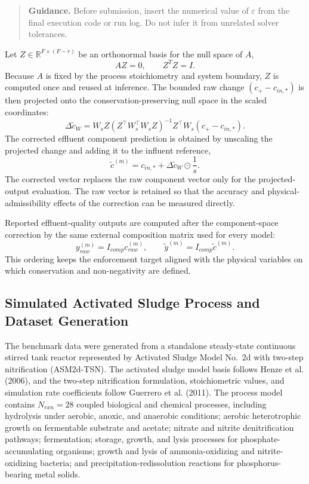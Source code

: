 \documentclass[a4paper,fleqn]{cas-sc}
\newcommand{\draftguidance}[1]{%
\begin{quote}
\small
\textbf{Guidance.} #1
\end{quote}
}
\begin{document}
\draftguidance{Before submission, insert the numerical value of $\varepsilon$ from the final execution code or run log. Do not infer it from unrelated solver tolerances.}

Let $Z \in \mathbb{R}^{F \times (F-r)}$ be an orthonormal basis for the null space of $A$,
\begin{equation}
\label{eq:null_space_basis}
AZ=0, \qquad Z^TZ=I.
\end{equation}
Because $A$ is fixed by the process stoichiometry and system boundary, $Z$ is computed once and reused at inference. The bounded raw change $(c_+ - c_{in,*})$ is then projected onto the conservation-preserving null space in the scaled coordinates:
\begin{equation}
\label{eq:kv_scaled_projection}
\Delta\tilde{c}_W =
W_s Z \left(Z^\top W_s^\top W_s Z\right)^{-1}
Z^\top W_s \left(c_+ - c_{in,*}\right).
\end{equation}
The corrected effluent component prediction is obtained by unscaling the projected change and adding it to the influent reference,
\begin{equation}
\label{eq:corrected_component_prediction}
\tilde{c}^{(m)} =
c_{in,*} + \Delta\tilde{c}_W \odot \frac{1}{s}.
\end{equation}
The corrected vector replaces the raw component vector only for the projected-output evaluation. The raw vector is retained so that the accuracy and physical-admissibility effects of the correction can be measured directly.

Reported effluent-quality outputs are computed after the component-space correction by the same external composition matrix used for every model:
\begin{equation}
\label{eq:reported_composites}
y_{raw}^{(m)} = I_{comp}c_{raw}^{(m)}, \qquad
\tilde{y}^{(m)} = I_{comp}\tilde{c}^{(m)}.
\end{equation}
This ordering keeps the enforcement target aligned with the physical variables on which conservation and non-negativity are defined.

\subsection{Simulated Activated Sludge Process and Dataset Generation}

The benchmark data were generated from a standalone steady-state continuous stirred tank reactor represented by Activated Sludge Model No.\ 2d with two-step nitrification (ASM2d-TSN). The activated sludge model basis follows Henze et al. (2006), and the two-step nitrification formulation, stoichiometric values, and simulation rate coefficients follow Guerrero et al. (2011). The process model contains $N_{rxn}=28$ coupled biological and chemical processes, including hydrolysis under aerobic, anoxic, and anaerobic conditions; aerobic heterotrophic growth on fermentable substrate and acetate; nitrate and nitrite denitrification pathways; fermentation; storage, growth, and lysis processes for phosphate-accumulating organisms; growth and lysis of ammonia-oxidizing and nitrite-oxidizing bacteria; and precipitation-redissolution reactions for phosphorus-bearing metal solids.
\end{document}
